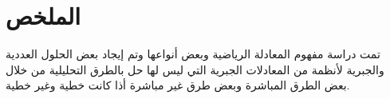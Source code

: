 \chapter*{الملخص}
تمت دراسة مفهوم المعادلة الرياضية وبعض أنواعها وتم إيجاد بعض الحلول العددية والجبرية لأنظمة من المعادلات الجبرية التي ليس لها حل بالطرق التحليلية من خلال بعض الطرق المباشرة وبعض طرق غير مباشرة أذا كانت خطية وغير خطية.
